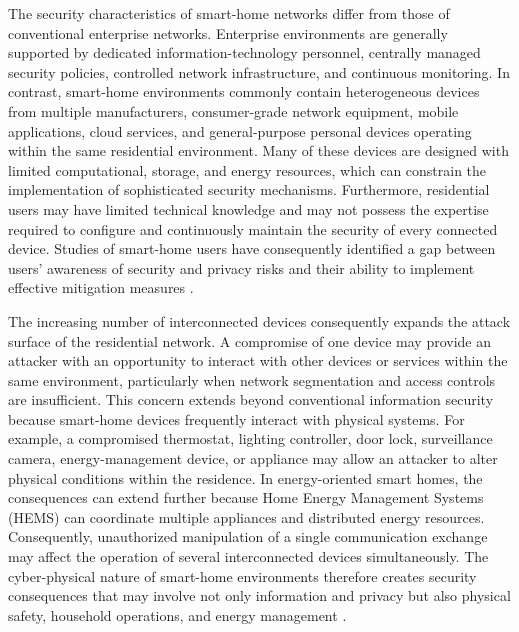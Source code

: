 The security characteristics of smart-home networks differ from those of conventional enterprise networks. Enterprise environments are generally supported by dedicated information-technology personnel, centrally managed security policies, controlled network infrastructure, and continuous monitoring. In contrast, smart-home environments commonly contain heterogeneous devices from multiple manufacturers, consumer-grade network equipment, mobile applications, cloud services, and general-purpose personal devices operating within the same residential environment. Many of these devices are designed with limited computational, storage, and energy resources, which can constrain the implementation of sophisticated security mechanisms. Furthermore, residential users may have limited technical knowledge and may not possess the expertise required to configure and continuously maintain the security of every connected device. Studies of smart-home users have consequently identified a gap between users' awareness of security and privacy risks and their ability to implement effective mitigation measures \citep{haneySmartHomeSecurity2020}.

The increasing number of interconnected devices consequently expands the attack surface of the residential network. A compromise of one device may provide an attacker with an opportunity to interact with other devices or services within the same environment, particularly when network segmentation and access controls are insufficient. This concern extends beyond conventional information security because smart-home devices frequently interact with physical systems. For example, a compromised thermostat, lighting controller, door lock, surveillance camera, energy-management device, or appliance may allow an attacker to alter physical conditions within the residence. In energy-oriented smart homes, the consequences can extend further because Home Energy Management Systems (HEMS) can coordinate multiple appliances and distributed energy resources. Consequently, unauthorized manipulation of a single communication exchange may affect the operation of several interconnected devices simultaneously. The cyber-physical nature of smart-home environments therefore creates security consequences that may involve not only information and privacy but also physical safety, household operations, and energy management \citep{heartfieldTaxonomyCyberphysicalThreats2018}.

